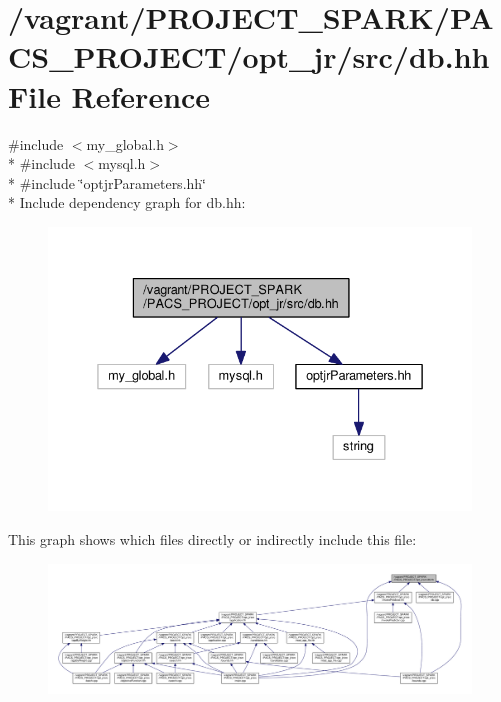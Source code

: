 \hypertarget{db_8hh}{\section{/vagrant/\-P\-R\-O\-J\-E\-C\-T\-\_\-\-S\-P\-A\-R\-K/\-P\-A\-C\-S\-\_\-\-P\-R\-O\-J\-E\-C\-T/opt\-\_\-jr/src/db.hh File Reference}
\label{db_8hh}
}
{\ttfamily \#include $<$my\-\_\-global.\-h$>$}\\*
{\ttfamily \#include $<$mysql.\-h$>$}\\*
{\ttfamily \#include \char`\"{}optjr\-Parameters.\-hh\char`\"{}}\\*
Include dependency graph for db.\-hh\-:\nopagebreak
\begin{figure}[H]
\begin{center}
\leavevmode
\includegraphics[width=334pt]{db_8hh__incl}
\end{center}
\end{figure}
This graph shows which files directly or indirectly include this file\-:\nopagebreak
\begin{figure}[H]
\begin{center}
\leavevmode
\includegraphics[width=350pt]{db_8hh__dep__incl}
\end{center}
\end{figure}
